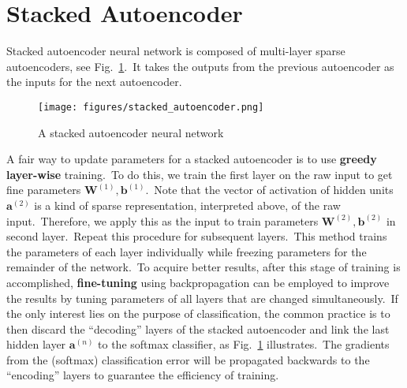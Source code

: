 \section{Stacked Autoencoder} \label{sec:stacked}
Stacked autoencoder neural network is composed of multi-layer sparse autoencoders, see Fig.~\ref{fig:stacked_autoencoder}.~It takes the outputs from the previous autoencoder as the inputs for the next autoencoder.
\begin{figure}[htbp]
	\centering
	\texttt{[image: figures/stacked\_autoencoder.png]}
	\caption{A stacked autoencoder neural network} \label{fig:stacked_autoencoder}
\end{figure}
A fair way to update parameters for a stacked autoencoder is to use \textbf{greedy layer-wise} training.~To do this, we train the first layer on the raw input to get fine parameters $\bm{W}^{(1)}, \bm{b}^{(1)}$.~Note that the vector of activation of hidden units $\bm{a}^{(2)}$ is a kind of sparse representation, interpreted above, of the raw input.~Therefore, we apply this as the input to train parameters $\bm{W}^{(2)}, \bm{b}^{(2)}$ in second layer.~Repeat this procedure for subsequent layers.~This method trains the parameters of each layer individually while freezing parameters for the remainder of the network.~To acquire better results, after this stage of training is accomplished, \textbf{fine-tuning} using backpropagation can be employed to improve the results by tuning parameters of all layers that are changed simultaneously.~If the only interest lies on the purpose of classification, the common practice is to then discard the ``decoding'' layers of the stacked autoencoder and link the last hidden layer $\bm{a}^{(n)}$ to the softmax classifier, as Fig.~\ref{fig:stacked_autoencoder} illustrates.~The gradients from the (softmax) classification error will be propagated backwards to the ``encoding'' layers to guarantee the efficiency of training.
